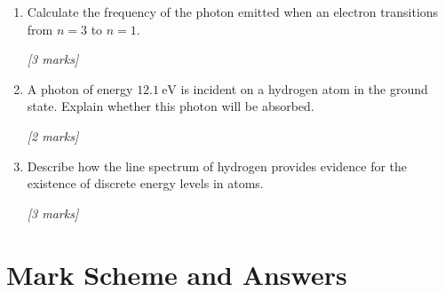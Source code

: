 \begin{tcolorbox}[colback=white, colframe=midblue, breakable]
\begin{enumerate}[label=(\alph*)]
  \item \begin{minipage}[t]{\linewidth}
  Calculate the frequency of the photon emitted when an electron transitions from $n = 3$ to $n = 1$.
  \par\hfill\textit{[3 marks]}
  \vspace{3.5cm}
  \end{minipage}

  \item \begin{minipage}[t]{\linewidth}
  A photon of energy $12.1\ \text{eV}$ is incident on a hydrogen atom in the ground state. Explain whether this photon will be absorbed.
  \par\hfill\textit{[2 marks]}
  \vspace{3.0cm}
  \end{minipage}

  \item \begin{minipage}[t]{\linewidth}
  Describe how the line spectrum of hydrogen provides evidence for the existence of discrete energy levels in atoms.
  \par\hfill\textit{[3 marks]}
  \vspace{4.0cm}
  \end{minipage}
\end{enumerate}

\end{tcolorbox}

\section{Mark Scheme and Answers}

